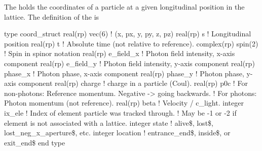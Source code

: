 The  holds the coordinates of a particle at a given
longitudinal position in the lattice. The definition of the
 is
\begin{example}
  type coord_struct
    real(rp) vec(6)     ! (x, px, y, py, z, pz)
    real(rp) s          ! Longitudinal position
    real(rp) t          ! Absolute time (not relative to reference).
    complex(rp) spin(2) ! Spin in spinor notation
    real(rp) e_field_x  ! Photon field intensity, x-axis component
    real(rp) e_field_y  ! Photon field intensity, y-axis component
    real(rp) phase_x    ! Photon phase, x-axis component
    real(rp) phase_y    ! Photon phase, y-axis component
    real(rp) charge     ! charge in a particle (Coul).
    real(rp) p0c        ! For non-photons: Reference momentum. Negative -> going backwards.
                        !     For photons: Photon momentum (not reference).
    real(rp) beta       ! Velocity / c_light. 
    integer ix_ele      ! Index of element particle was tracked through.
                        !   May be -1 or -2 if element is not associated with a lattice.
    integer state       ! alive\$, lost\$, lost_neg_x_aperture\$, etc.
    integer location    ! entrance_end\$, inside\$, or exit_end\$
end type
\end{example}

